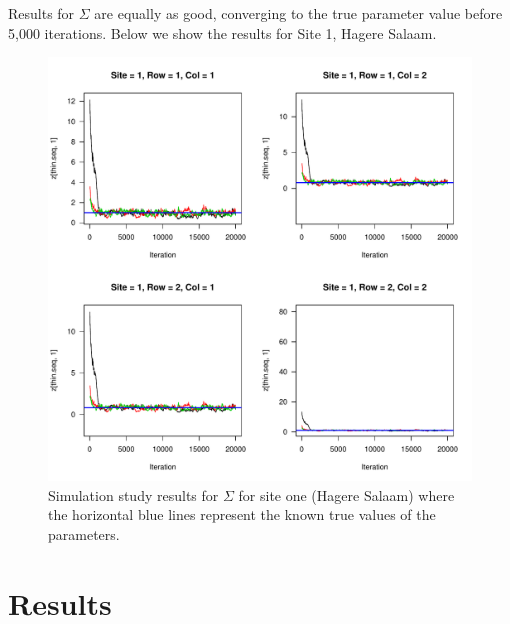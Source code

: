 \documentclass[11pt]{article}
\begin{document}
Results for $\Sigma$ are equally as good, converging to the true parameter value before 5,000 iterations. Below we show the results for Site 1, Hagere Salaam. 

\begin{figure}[htbp]
\begin{center}
\caption{Simulation study results for $\Sigma$ for site one (Hagere Salaam) where the horizontal blue lines represent the known true values of the parameters.}  
\includegraphics[page=1,width=5.0in]{fig_tobit_trace_sigma_covariance_sim.pdf}   
\end{center}
\end{figure}





\section{Results}\label{sec:results}
\end{document}
